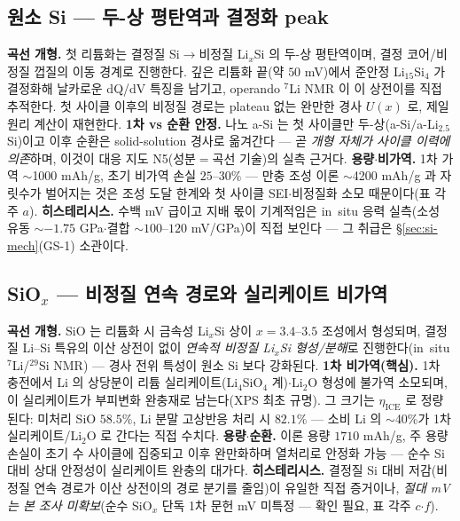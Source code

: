 \subsection{원소 Si --- 두-상 평탄역과 결정화 peak}\label{ssec:si-elemental}
\textbf{곡선 개형.} 첫 리튬화는 결정질 Si$\to$비정질 Li$_x$Si 의 두-상 평탄역이며, 결정 코어/비정질 껍질의
이동 경계로 진행한다\cite{limthongkul2003,li_dahn2007}. 깊은 리튬화 끝(약 $50$
mV)에서 준안정 Li$_{15}$Si$_4$ 가 결정화해 날카로운 dQ/dV 특징을 남기고\cite{obrovac_christensen2004},
operando $^7$Li NMR 이 이 상전이를 직접 추적한다\cite{ogata_nmr2014}. 첫 사이클 이후의 비정질 경로는
plateau 없는 완만한 경사 $U(x)$ 로, 제일원리 계산이 재현한다\cite{chevrier_dahn2009}.
\textbf{1차 vs 순환 안정.} 나노 a-Si 는 첫 사이클만 두-상(a-Si$/$a-Li$_{2.5}$Si)이고 이후 순환은
solid-solution 경사로 옮겨간다\cite{wang_asi2013,mcdowell_coreshell2013} --- 곧 \emph{개형 자체가 사이클 이력에 의존}하며, 이것이
대응 지도 N5(성분$=$곡선 기술)의 실측 근거다. \textbf{용량$\cdot$비가역.} 1차 가역 $\sim$1000 mAh/g,
초기 비가역 손실 $25$--$30\%$\cite{limthongkul2003} --- 만충 조성 이론 $\sim$4200 mAh/g\cite{wen_huggins1981}
과 자릿수가 벌어지는 것은 조성 도달 한계와 첫 사이클 SEI$\cdot$비정질화 소모 때문이다(표 각주 $a$).
\textbf{히스테리시스.} 수백 mV 급이고 지배 몫이 기계적임은 in~situ 응력 실측(소성 유동 $\sim-1.75$
GPa$\cdot$결합 $\sim100$--$120$ mV/GPa)이 직접 보인다\cite{sethuraman_stressevo2010,sethuraman_stresspot2010}
--- 그 취급은 \S\ref{sec:si-mech}(GS-1) 소관이다.

\subsection{SiO$_x$ --- 비정질 연속 경로와 실리케이트 비가역}\label{ssec:si-siox}
\textbf{곡선 개형.} SiO 는 리튬화 시 금속성 Li$_x$Si 상이 $x{=}3.4$--$3.5$ 조성에서 형성되며, 결정질 Li--Si
특유의 이산 상전이 없이 \emph{연속적 비정질 Li$_x$Si 형성/분해}로 진행한다(in~situ $^7$Li/$^{29}$Si
NMR)\cite{kitada_sio2019} --- 경사 전위 특성이 원소 Si 보다 강화된다. \textbf{1차 비가역(핵심).} 1차
충전에서 Li 의 상당분이 리튬 실리케이트(Li$_4$SiO$_4$ 계)$\cdot$Li$_2$O 형성에 불가역 소모되며, 이
실리케이트가 부피변화 완충재로 남는다(XPS 최초 규명\cite{miyachi_sio2005}). 그 크기는 $\eta_\mathrm{ICE}$
로 정량된다: 미처리 SiO $58.5\%$, Li 분말 고상반응 처리 시 $82.1\%$\cite{yom_sio2016} --- 소비 Li 의
$\sim$40\%가 1차 실리케이트/Li$_2$O 로 간다는 직접 수치다. \textbf{용량$\cdot$순환.} 이론 용량 $1710$
mAh/g, 주 용량손실이 초기 수 사이클에 집중되고 이후 완만화하며 열처리로 안정화 가능\cite{zhang_sio2018}
--- 순수 Si 대비 상대 안정성이 실리케이트 완충의 대가다. \textbf{히스테리시스.} 결정질 Si 대비 저감(비정질
연속 경로가 이산 상전이의 경로 분기를 줄임)이 유일한 직접 증거\cite{kitada_sio2019}이나, \emph{절대 mV 는
본 조사 미확보}(순수 SiO$_x$ 단독 1차 문헌 mV 미특정 --- 확인 필요, 표 각주 $c$$\cdot$$f$).


